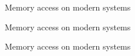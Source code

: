\documentclass[NET,english,aspectratio=43,notitleframe]{tumbeamer}
\begin{document}
\begin{frame}{Memory access on modern systems}
\centering
\end{frame}

\begin{frame}{Memory access on modern systems}
\centering
\end{frame}

\begin{frame}{Memory access on modern systems}
\centering
\end{frame}

%
%
%
%
\end{document}
